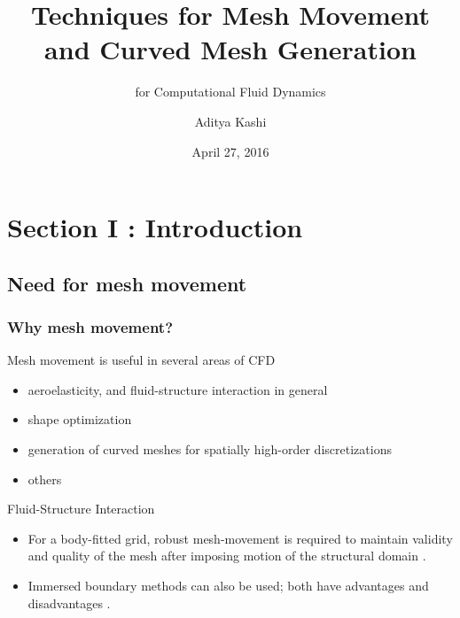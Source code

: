 \documentclass[t,12pt]{beamer}
\title[Mesh movement and curved mesh generation] %
{Techniques for Mesh Movement and Curved Mesh Generation}
\subtitle{for Computational Fluid Dynamics} %
\author[] %
{Aditya Kashi}
\institute[NCSU]
{
  Department of Mechanical and Aerospace Engineering,\\
  North Carolina State University
}
\date{April 27, 2016} %
\begin{document}
\begin{frame}
  \titlepage
\end{frame}

\section{Section I : Introduction}

\subsection{Need for mesh movement}

\begin{frame}
  \frametitle{Why mesh movement?}
  \begin{block}{Mesh movement is useful in several areas of CFD}
	  \begin{itemize}
	  	\item aeroelasticity, and fluid-structure interaction in general
	  	\item shape optimization
	  	\item generation of curved meshes for spatially high-order discretizations
	  	\item others
	  \end{itemize}
  \end{block}
\end{frame}

\begin{frame}{Fluid-Structure Interaction}
	\begin{itemize}
		\item For a body-fitted grid, robust mesh-movement is required to maintain validity and quality of the mesh after imposing motion of the structural domain .
		\item Immersed boundary methods can also be used; both have advantages and disadvantages .
	\end{itemize}
\end{frame}
\end{document}
